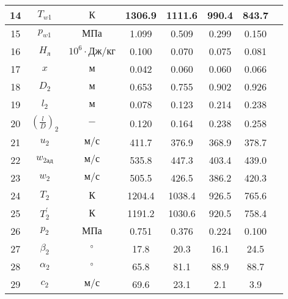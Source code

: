 \begin{landscape}
\begin{center}
\begin{longtable}{|c|c|c|c|c|c|c|c|}
            14 & $T_{w1}$ & $К$ & 1306.9 & 1111.6 & 990.4 & 843.7 \\\hline
            
            15 & $p_{w1}$ & $МПа$ & 1.099 & 0.509 & 0.299 & 0.150 \\\hline
            
            16 & $H_л$ & $10^6 \cdot Дж/кг$ & 0.100 & 0.070 & 0.075 & 0.081 \\\hline
            
            17 & $x$ & $м$ & 0.042 & 0.060 & 0.060 & 0.066 \\\hline
            
            18 & $D_2$ & $м$ & 0.653 & 0.755 & 0.902 & 0.926 \\\hline
            
            19 & $l_2$ & $м$ & 0.078 & 0.123 & 0.214 & 0.238 \\\hline
            
            20 & $\left( \frac{l}{D} \right)_2$ & $-$ & 0.120 & 0.164 & 0.238 & 0.258 \\\hline
            
            21 & $u_2$ & $м/с$ & 411.7 & 376.9 & 368.9 & 378.7 \\\hline
            
            22 & $w_{2ад}$ & $м/с$ & 535.8 & 447.3 & 403.4 & 439.0 \\\hline
            
            23 & $w_2$ & $м/с$ & 505.5 & 426.5 & 386.2 & 420.3 \\\hline
            
            24 & $T_2$ & $К$ & 1204.4 & 1038.4 & 926.5 & 765.6 \\\hline
            
            25 & $T_2^\prime$ & $К$ & 1191.2 & 1030.6 & 920.5 & 758.4 \\\hline
            
            26 & $p_2$ & $МПа$ & 0.751 & 0.376 & 0.224 & 0.100 \\\hline
            
            27 & $\beta_2$ & $\degree$ & 17.8 & 20.3 & 16.1 & 24.5 \\\hline
            
            28 & $\alpha_2$ & $\degree$ & 65.8 & 81.1 & 88.9 & 88.7 \\\hline
            
            29 & $c_2$ & $м/с$ & 69.6 & 23.1 & 2.1 & 3.9 \\\hline
            

\end{longtable}
\end{center}
\end{landscape}
